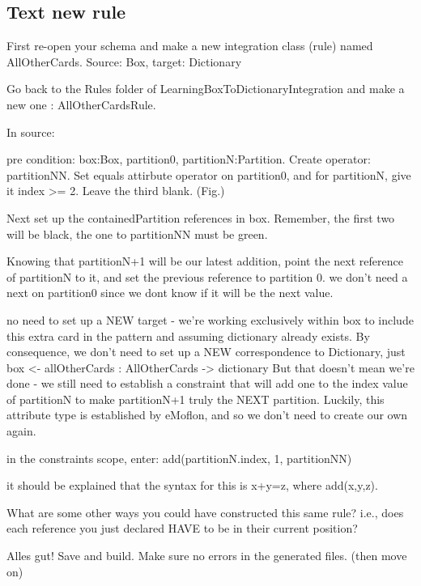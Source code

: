 \newpage
\hypertarget{allCards tex}{}
\subsection{Text new rule}
\texHeader

First re-open your schema and make a new integration class (rule) named AllOtherCards. Source: Box, target: Dictionary

Go back to the Rules folder of LearningBoxToDictionaryIntegration and make a new one : AllOtherCardsRule.

In source:

pre condition: box:Box, partition0, partitionN:Partition. Create operator: partitionNN. Set equals attirbute operator on partition0, and for partitionN, give
it index >= 2. Leave the third blank. (Fig.)

Next set up the containedPartition references in box. Remember, the first two will be black, the one to partitionNN must be green.

Knowing that partitionN+1 will be our latest addition, point the next reference of partitionN to it, and set the previous reference to partition 0. we don't
need a next on partition0 since we dont know if it will be the next value.

no need to set up a NEW target - we're working exclusively within box to include this extra card in the pattern and assuming dictionary already exists. By
consequence, we don't need to set up a NEW correspondence to Dictionary, just box <- allOtherCards : AllOtherCards -> dictionary
But that doesn't mean we're done - we still need to establish a constraint that
will add one to the index value of partitionN to make partitionN+1 truly the NEXT partition. Luckily, this attribute type is established by eMoflon, and so we don't need to create our own again. 

in the constraints scope, enter:
add(partitionN.index, 1, partitionNN)

it should be explained that the syntax for this is x+y=z, where add(x,y,z).

What are some other ways you could have constructed this same rule? i.e., does each reference you just declared HAVE to be in their current position?

Alles gut! Save and build. Make sure no errors in the generated files. (then move on)
